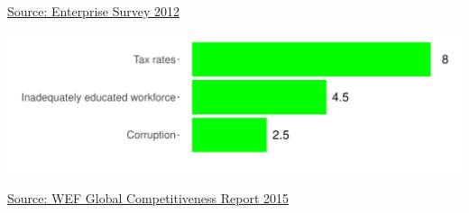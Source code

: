 \documentclass{article}\usepackage[]{graphicx}\usepackage[]{color}
\makeatletter
\def\maxwidth{ %
  \ifdim\Gin@nat@width>\linewidth
    \linewidth
  \else
    \Gin@nat@width
  \fi
}
\makeatother
\begin{document}
\begin{minipage}[b]{0.99\textwidth}
\begin{minipage}[b]{0.99\textwidth}
\begin{minipage}[c]{0.49\textwidth}
{}



      \hspace*{0.3cm} \raggedright\footnotesize{\href{https://www.enterprisesurveys.org/data}{Source: Enterprise Survey 2012}}
    \end{minipage}
    \begin{minipage}[c]{0.49\textwidth} %


{\centering \includegraphics[width=\maxwidth]{figure/top5constraintsWEF-1} 

}



    \hspace*{0.3cm} \raggedright\footnotesize{\href{http://www.weforum.org/reports/global-competitiveness-report-2015-2016}{Source: WEF Global Competitiveness Report 2015}}
    \end{minipage}
  \end{minipage}
\end{minipage}


\end{document}
